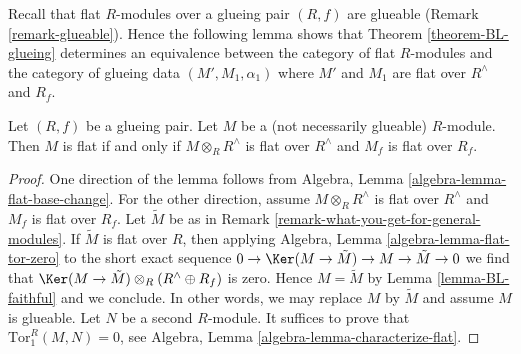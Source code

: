 \noindent
Recall that flat $R$-modules over a glueing pair $(R, f)$ are glueable
(Remark \ref{remark-glueable}). Hence the following lemma shows that
Theorem \ref{theorem-BL-glueing} determines an equivalence between
the category of flat $R$-modules and
the category of glueing data $(M', M_1, \alpha_1)$ where $M'$
and $M_1$ are flat over $R^\wedge$ and $R_f$.

\begin{lemma}
\label{lemma-BL-flat}
Let $(R, f)$ be a glueing pair. Let $M$ be a (not necessarily glueable)
$R$-module. Then $M$ is flat if and only if
$M \otimes_R R^\wedge$ is flat over $R^\wedge$
and $M_f$ is flat over $R_f$.
\end{lemma}

\begin{proof}
One direction of the lemma follows from
Algebra, Lemma \ref{algebra-lemma-flat-base-change}.
For the other direction, assume $M \otimes_R R^\wedge$
is flat over $R^\wedge$ and $M_f$ is flat over $R_f$.
Let $\tilde M$ be as in Remark \ref{remark-what-you-get-for-general-modules}.
If $\tilde M$ is flat over $R$, then applying
Algebra, Lemma \ref{algebra-lemma-flat-tor-zero}
to the short exact sequence
$0 \to \Ker(M \to \tilde M) \to M \to \tilde M \to 0$
we find that $\Ker(M \to \tilde M) \otimes_R (R^\wedge \oplus R_f)$ is zero.
Hence $M = \tilde M$ by Lemma \ref{lemma-BL-faithful} and we conclude.
In other words, we may replace $M$ by $\tilde M$ and assume
$M$ is glueable. Let $N$ be a second $R$-module.
It suffices to prove that $\text{Tor}_1^R(M, N) = 0$, see
Algebra, Lemma \ref{algebra-lemma-characterize-flat}.


\end{proof}
